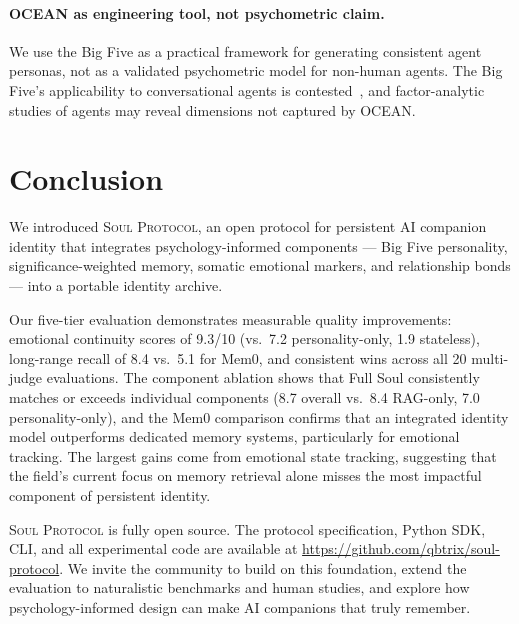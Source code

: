 \documentclass{article}
\newcommand{\soul}{\textsc{Soul Protocol}}
\begin{document}
\paragraph{OCEAN as engineering tool, not psychometric claim.} We use the Big Five as a practical framework for generating consistent agent personas, not as a validated psychometric model for non-human agents. The Big Five's applicability to conversational agents is contested~\cite{ren2025bigfive}, and factor-analytic studies of agents may reveal dimensions not captured by OCEAN.


\section{Conclusion}
\label{sec:conclusion}

We introduced \soul{}, an open protocol for persistent AI companion identity that integrates psychology-informed components --- Big Five personality, significance-weighted memory, somatic emotional markers, and relationship bonds --- into a portable identity archive.

Our five-tier evaluation demonstrates measurable quality improvements: emotional continuity scores of 9.3/10 (vs.\ 7.2 personality-only, 1.9 stateless), long-range recall of 8.4 vs.\ 5.1 for Mem0, and consistent wins across all 20 multi-judge evaluations. The component ablation shows that Full Soul consistently matches or exceeds individual components (8.7 overall vs.\ 8.4 RAG-only, 7.0 personality-only), and the Mem0 comparison confirms that an integrated identity model outperforms dedicated memory systems, particularly for emotional tracking. The largest gains come from emotional state tracking, suggesting that the field's current focus on memory retrieval alone misses the most impactful component of persistent identity.

\soul{} is fully open source. The protocol specification, Python SDK, CLI, and all experimental code are available at \url{https://github.com/qbtrix/soul-protocol}. We invite the community to build on this foundation, extend the evaluation to naturalistic benchmarks and human studies, and explore how psychology-informed design can make AI companions that truly remember.


\end{document}
